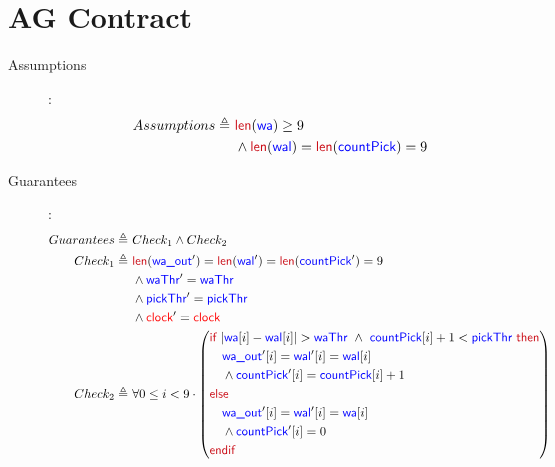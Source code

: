 \documentclass[fleqn,a4paper]{article}
\newcommand\Var[1]{\textcolor{blue}{\textsf{#1}}}
\newcommand\syntax[1]{\textcolor[RGB]{202,12,22}{\textsf{#1}}}
\newcommand\clock{\textcolor{red}{\textsf{clock}}}
\newcommand\definedby{\triangleq}
\begin{document}
\newpage

\section{AG Contract}

\begin{description}
\item[Assumptions]:
\begin{align*}
Assumptions \definedby \
& \syntax{len}(\Var{wa}) \geq 9 \\
& \wedge \syntax{len}(\Var{wal}) = \syntax{len}(\Var{countPick}) = 9
\end{align*}

\item[Guarantees]:
\begin{align*}
Guarantees \definedby \
& Check_1 \wedge Check_2 \\
Check_1 \definedby \
& \syntax{len}(\Var{wa\_out}') = \syntax{len}(\Var{wal}') = \syntax{len}(\Var{countPick}') = 9 \\
& \wedge \Var{waThr}' = \Var{waThr} \\
& \wedge \Var{pickThr}' = \Var{pickThr} \\
& \wedge \clock'=\clock \\
Check_2 \definedby \
& \forall 0 \leq i < 9 \cdot
\left(
\begin{aligned}
& \syntax{if } |\Var{wa}[i]-\Var{wal}[i]| > \Var{waThr} \ \wedge \ \Var{countPick}[i]+1 < \Var{pickThr} \syntax{ then} \\
& \quad \Var{wa\_out}'[i] = \Var{wal}'[i] = \Var{wal}[i] \\
& \quad \wedge \Var{countPick}'[i] = \Var{countPick}[i]+1 \\
& \syntax{else} \\
& \quad \Var{wa\_out}'[i] = \Var{wal}'[i] = \Var{wa}[i] \\
& \quad \wedge \Var{countPick}'[i] = 0 \\
& \syntax{endif}
\end{aligned}
\right)
\end{align*}

\end{description}
\end{document}
